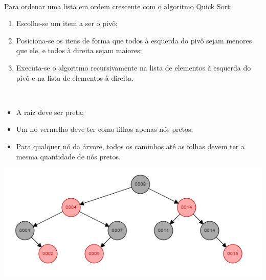 \documentclass[answers]{exam}
\begin{document}
\begin{questions}
    \
    \begin{solution}
        Para ordenar uma lista em ordem crescente com o algoritmo Quick Sort:
        \begin{enumerate}
            \item Escolhe-se um item a ser o piv\^{o};
            \item Posiciona-se os itens de forma que todos à esquerda do piv\^{o}
                sejam menores que ele, e todos à direita sejam maiores;
            \item Executa-se o algoritmo recursivamente na lista de elementos à
                esquerda do piv\^{o} e na lista de elementos à direita.
        \end{enumerate}
    \end{solution}
    \
    \begin{solution}
        \begin{itemize}
            \item A raiz deve ser preta;
            \item Um nó vermelho deve ter como filhos apenas nós pretos;
            \item Para qualquer nó da árvore, todos os caminhos até as folhas
                devem ter a mesma quantidade de nós pretos.
        \end{itemize}
        \begin{center}
            \includegraphics[width=.8\textwidth]{img/rbtree}
        \end{center}
    \end{solution}
  \end{questions}
\end{document}
